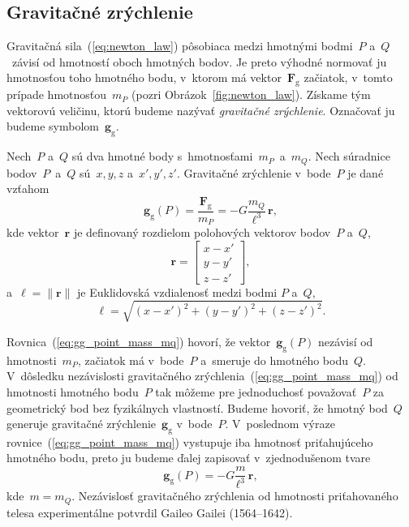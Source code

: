 \documentclass[a4paper, 12pt]{book}
\newcommand{\gidx}{\mathrm g}
\let\vec\mathbf
\begin{document}
\subsection{Gravitačné zrýchlenie}
\label{sec:gg}

Gravitačná sila~(\ref{eq:newton_law}) pôsobiaca medzi hmotnými bodmi~$P$ 
a~$Q$~závisí od hmotností oboch hmotných bodov.  Je preto výhodné normovať ju 
hmotnosťou toho hmotného bodu, v~ktorom má vektor~$\vec F_\gidx$ začiatok, 
v~tomto prípade hmotnosťou~$m_P$ (pozri Obrázok~\ref{fig:newton_law}).  Získame 
tým vektorovú veličinu, ktorú budeme nazývať \emph{gravitačné zrýchlenie}.  
Označovať ju budeme symbolom~$\vec g_\gidx$.

Nech~$P$ a~$Q$ sú dva hmotné body s~hmotnosťami~$m_P$~a~$m_Q$.  Nech súradnice 
bodov~$P$~a~$Q$ sú~$x, y, z$ a~$x', y', z'$.  Gravitačné zrýchlenie v~bode~$P$ 
je dané vzťahom
%
\begin{equation}
\label{eq:gg_point_mass_mq}
\vec g_\gidx(P) = \frac{\vec F_\gidx}{m_P} = -G \frac{m_Q}{\ell^3} \, 
\vec{r}{,}
\end{equation}
%
kde vektor~$\vec r$ je definovaný rozdielom polohových vektorov bodov~$P$ 
a~$Q$,
%
\begin{equation}
\label{eq:r}
\vec r =
%
\begin{bmatrix}
x - x'\\
y - y'\\
z - z'
\end{bmatrix}
{,}
\end{equation}
%
a~$\ell = \| \vec r \|$ je Euklidovská vzdialenosť medzi bodmi $P$ a~$Q$,
%
\begin{equation}
\label{eq:l}
\ell = \sqrt{(x - x')^2 + (y - y')^2 + (z - z')^2}{.}
\end{equation}

Rovnica~(\ref{eq:gg_point_mass_mq}) hovorí, že vektor~$\vec g_\gidx(P)$ 
nezávisí od hmotnosti~$m_P$, začiatok má v~bode~$P$ a~smeruje do hmotného 
bodu~$Q$.  V~dôsledku nezávislosti gravitačného 
zrýchlenia~(\ref{eq:gg_point_mass_mq}) od hmotnosti hmotného bodu~$P$ tak 
môžeme pre jednoduchosť považovať~$P$ za geometrický bod bez fyzikálnych 
vlastností.  Budeme hovoriť, že hmotný bod~$Q$ generuje gravitačné 
zrýchlenie~$\vec g_\gidx$ v~bode~$P$.  V~poslednom výraze 
rovnice~(\ref{eq:gg_point_mass_mq}) vystupuje iba hmotnosť priťahujúceho 
hmotného bodu, preto ju budeme ďalej zapisovať v~zjednodušenom tvare
%
\begin{equation}
\label{eq:gg_point_mass}
\vec g_\gidx(P) = -G \frac{m}{\ell^3} \, \vec{r}{,}
\end{equation}
%
kde~$m = m_Q$.  Nezávislosť gravitačného zrýchlenia od 
hmotnosti priťahovaného telesa experimentálne potvrdil Gaileo Gailei 
(1564--1642).
\end{document}
